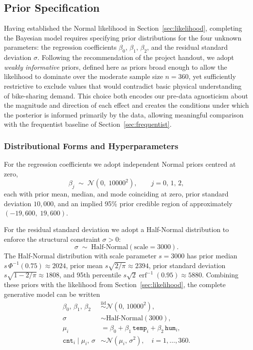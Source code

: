\subsection{Prior Specification}\label{sec:prior}

Having established the Normal likelihood in Section~\ref{sec:likelihood}, completing the Bayesian model requires specifying prior distributions for the four unknown parameters: the regression coefficients $\beta_0,\, \beta_1,\, \beta_2$, and the residual standard deviation $\sigma$. Following the recommendation of the project handout, we adopt \emph{weakly informative} priors, defined here as priors broad enough to allow the likelihood to dominate over the moderate sample size $n = 360$, yet sufficiently restrictive to exclude values that would contradict basic physical understanding of bike-sharing demand. This choice both encodes our pre-data agnosticism about the magnitude and direction of each effect and creates the conditions under which the posterior is informed primarily by the data, allowing meaningful comparison with the frequentist baseline of Section~\ref{sec:frequentist}.

\subsubsection{Distributional Forms and Hyperparameters}

For the regression coefficients we adopt independent Normal priors centred at zero,
\begin{equation}
    \beta_j \;\sim\; \mathcal{N}\!\left(0,\; 10000^{2}\right), \qquad j = 0,\, 1,\, 2,
\end{equation}
each with prior mean, median, and mode coinciding at zero, prior standard deviation $10{,}000$, and an implied 95\% prior credible region of approximately $(-19{,}600,\; 19{,}600)$.

For the residual standard deviation we adopt a Half-Normal distribution to enforce the structural constraint $\sigma > 0$:
\begin{equation}
    \sigma \;\sim\; \text{Half-Normal}\!\left(\text{scale} = 3000\right).
\end{equation}
The Half-Normal distribution with scale parameter $s = 3000$ has prior median $s\,\Phi^{-1}(0.75) \approx 2024$, prior mean $s\sqrt{2/\pi} \approx 2394$, prior standard deviation $s\sqrt{1 - 2/\pi} \approx 1808$, and 95th percentile $s\sqrt{2}\operatorname{erf}^{-1}(0.95) \approx 5880$. Combining these priors with the likelihood from Section~\ref{sec:likelihood}, the complete generative model can be written
\begin{align}
    \beta_0,\, \beta_1,\, \beta_2 &\stackrel{\text{iid}}{\sim} \mathcal{N}(0,\, 10000^{2}), \\
    \sigma &\sim \text{Half-Normal}(3000), \\
    \mu_i &= \beta_0 + \beta_1\,\texttt{temp}_i + \beta_2\,\texttt{hum}_i, \\
    \texttt{cnt}_i \mid \mu_i,\, \sigma &\sim \mathcal{N}(\mu_i,\, \sigma^{2}), \quad i = 1, \dots, 360.
\end{align}

